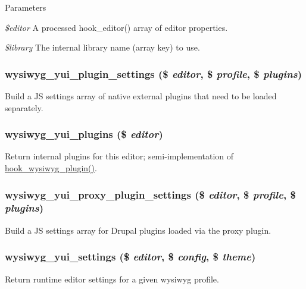 \begin{DoxyParams}{Parameters}
\item[{\em \$editor}]A processed hook\_\-editor() array of editor properties. \item[{\em \$library}]The internal library name (array key) to use. \end{DoxyParams}
\hypertarget{yui_8inc_a33cbd26e67433dfe1067300cd9355262}{
\subsubsection[{wysiwyg\_\-yui\_\-plugin\_\-settings}]{\setlength{\rightskip}{0pt plus 5cm}wysiwyg\_\-yui\_\-plugin\_\-settings (\$ {\em editor}, \/  \$ {\em profile}, \/  \$ {\em plugins})}}
\label{yui_8inc_a33cbd26e67433dfe1067300cd9355262}
Build a JS settings array of native external plugins that need to be loaded separately. \hypertarget{yui_8inc_a01692098e547ebef75d113a738852b4e}{
\subsubsection[{wysiwyg\_\-yui\_\-plugins}]{\setlength{\rightskip}{0pt plus 5cm}wysiwyg\_\-yui\_\-plugins (\$ {\em editor})}}
\label{yui_8inc_a01692098e547ebef75d113a738852b4e}
Return internal plugins for this editor; semi-\/implementation of \hyperlink{wysiwyg_8api_8php_abad2b35b32be0b20d73006b73205045c}{hook\_\-wysiwyg\_\-plugin()}. \hypertarget{yui_8inc_aca5a4d7d50e126e896bc35b629bb4143}{
\subsubsection[{wysiwyg\_\-yui\_\-proxy\_\-plugin\_\-settings}]{\setlength{\rightskip}{0pt plus 5cm}wysiwyg\_\-yui\_\-proxy\_\-plugin\_\-settings (\$ {\em editor}, \/  \$ {\em profile}, \/  \$ {\em plugins})}}
\label{yui_8inc_aca5a4d7d50e126e896bc35b629bb4143}
Build a JS settings array for Drupal plugins loaded via the proxy plugin. \hypertarget{yui_8inc_ac46735d17eceaea7833470b4408d0eb6}{
\subsubsection[{wysiwyg\_\-yui\_\-settings}]{\setlength{\rightskip}{0pt plus 5cm}wysiwyg\_\-yui\_\-settings (\$ {\em editor}, \/  \$ {\em config}, \/  \$ {\em theme})}}
\label{yui_8inc_ac46735d17eceaea7833470b4408d0eb6}
Return runtime editor settings for a given wysiwyg profile.


